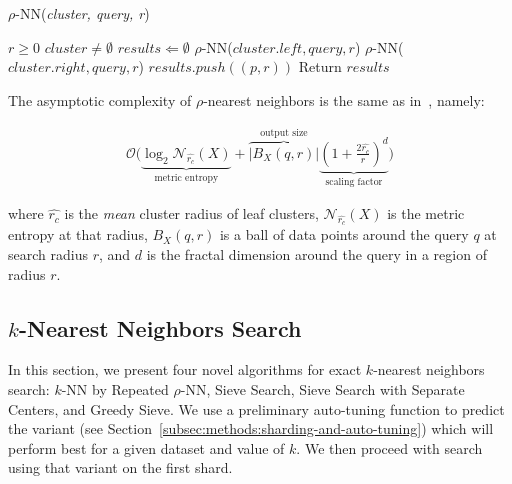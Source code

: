 \begin{algorithm} 
    \caption{$\rho$-NN(\emph{cluster, query, r})} 
    \label{alg:methods:rnn-search} 
    \begin{algorithmic}
        \REQUIRE $r \geq 0$
        \REQUIRE $cluster \neq \emptyset$
        \STATE $results \Leftarrow \emptyset$
                \STATE $\rho$-NN($cluster.left, query, r$)
            \ENDIF
        \ENDIF
                \STATE $\rho$-NN($cluster.right, query, r$)
            \ENDIF
        \ENDIF
                    \STATE $results.push((p, r))$
                \ENDIF
            \ENDFOR
        \ENDIF
        \STATE Return $results$
    \end{algorithmic}
\end{algorithm}

The asymptotic complexity of $\rho$-nearest neighbors is the same as in~\cite{ishaq2019clustered}, namely:

\begin{gather}
    \mathcal{O}\Bigg(
    \underbrace{\log_2 \mathcal{N}_{\hat{r_c}}(X)}_{\textrm{metric entropy}} +
    \overbrace{\left|B_X(q,r)\right|}^{\textrm{output size}}
    \underbrace{\left(1+\frac{2\hat{r_c}}{r}\right)^d}_{\textrm{scaling factor}}\Bigg)
    \label{hierarchical-complexity}
\end{gather}

where $\hat{r_c}$ is the \textit{mean} cluster radius of leaf clusters, $\mathcal{N}_{\hat{r_c}}(X)$ is the metric entropy at that radius, $B_X(q,r)$ is a ball of data points around the query $q$ at search radius $r$, and $d$ is the fractal dimension around the query in a region of radius $r$.


\subsection{\texorpdfstring{$k$}{k}-Nearest Neighbors Search}
\label{subsec:methods:knn-search}

In this section, we present four novel algorithms for exact $k$-nearest neighbors search: $k$-NN by Repeated $\rho$-NN, Sieve Search, Sieve Search with Separate Centers, and Greedy Sieve. 
We use a preliminary auto-tuning function to predict the variant (see Section~\ref{subsec:methods:sharding-and-auto-tuning}) which will perform 
best for a given dataset and value of $k$.
We then proceed with search using that variant on the first shard. 

